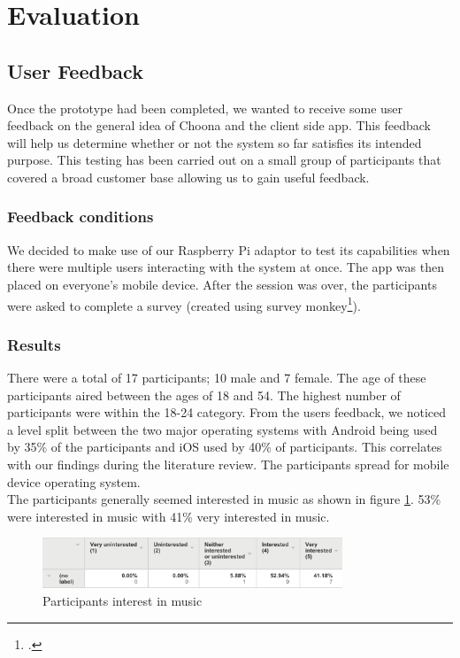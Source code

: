 \section{Evaluation}

\subsection{User Feedback}
Once the prototype had been completed, we wanted to receive some user feedback on the general idea of Choona and the client side app. This feedback will help us determine whether or not the system so far satisfies its intended purpose. This testing has been carried out on a small group of participants that covered a broad customer base allowing us to gain useful feedback.

\subsubsection{Feedback conditions}
We decided to make use of our Raspberry Pi adaptor to test its capabilities when there were multiple users interacting with the system at once. The app was then placed on everyone's mobile device. After the session was over, the participants were asked to complete a survey (created using survey monkey\footcite{survey}).  

\subsubsection{Results}
There were a total of 17 participants; 10 male and 7 female. The age of these participants aired between the ages of 18 and 54. The highest number of participants were within the 18-24 category.    
From the users feedback, we noticed a level split between the two major operating systems with Android being used by 35\% of the participants and iOS used by 40\% of participants.  This correlates with our findings during the literature review.  The participants spread for mobile device operating system.  \\
The participants generally seemed interested in music as shown in figure \ref{fig:interest_music}.  53\% were interested in music with 41\% very interested in music.  \\

    \begin{figure}[h!]
      \centering
      \includegraphics[width=0.8\textwidth]{./img/music_interest.png}
      \caption{Participants interest in music}
      \label{fig:interest_music}
    \end{figure}

